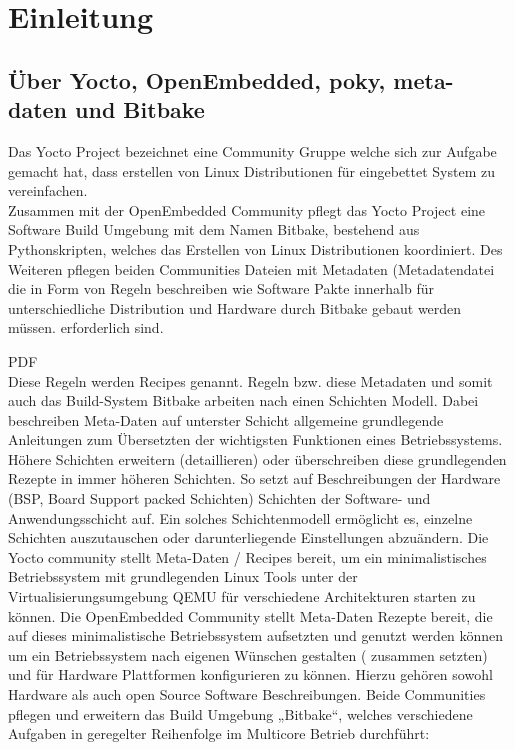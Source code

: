 \chapter{Einleitung} \label{chp:einleitung}


\section{Über Yocto, OpenEmbedded, poky, meta-daten und Bitbake}

Das Yocto Project bezeichnet eine Community Gruppe welche sich zur Aufgabe
gemacht hat, dass erstellen von Linux Distributionen für eingebettet System
zu vereinfachen.
\\

Zusammen mit der OpenEmbedded Community pflegt das \gls{Yocto Project} eine
Software Build Umgebung mit dem Namen \gls{Bitbake}, bestehend aus
Pythonskripten, welches das Erstellen von Linux Distributionen koordiniert.
Des Weiteren pflegen beiden Communities Dateien mit \gls{Metadaten}
(\gls{Metadatendatei} die in Form von Regeln  beschreiben wie Software Pakte
innerhalb für unterschiedliche Distribution und Hardware durch Bitbake gebaut
werden müssen.  erforderlich sind.

\ac{PDF}
\\

Diese Regeln  werden \gls{Recipes} genannt. Regeln bzw. diese Metadaten und
somit auch das Build-System Bitbake arbeiten nach einen Schichten Modell.
Dabei beschreiben Meta-Daten auf unterster Schicht allgemeine grundlegende
Anleitungen zum Übersetzten der wichtigsten Funktionen eines Betriebssystems.
Höhere Schichten erweitern (detaillieren) oder überschreiben diese grundlegenden
Rezepte in immer höheren Schichten. So setzt auf Beschreibungen der Hardware
(BSP, Board Support packed Schichten) Schichten der Software- und
Anwendungsschicht auf. Ein solches Schichtenmodell ermöglicht es, einzelne
Schichten auszutauschen oder darunterliegende Einstellungen abzuändern.
Die Yocto community stellt Meta-Daten / Recipes bereit, um ein
minimalistisches Betriebssystem mit grundlegenden  Linux Tools unter der
Virtualisierungsumgebung QEMU für verschiedene Architekturen starten zu können.
Die OpenEmbedded Community stellt Meta-Daten Rezepte bereit, die auf dieses
minimalistische Betriebssystem aufsetzten und genutzt werden können um ein
Betriebssystem nach eigenen Wünschen gestalten ( zusammen setzten) und für
Hardware Plattformen konfigurieren zu können. Hierzu gehören sowohl Hardware als
auch open Source Software Beschreibungen. Beide Communities pflegen und
erweitern das Build Umgebung „Bitbake“, welches verschiedene Aufgaben in
geregelter
Reihenfolge im Multicore Betrieb durchführt:

